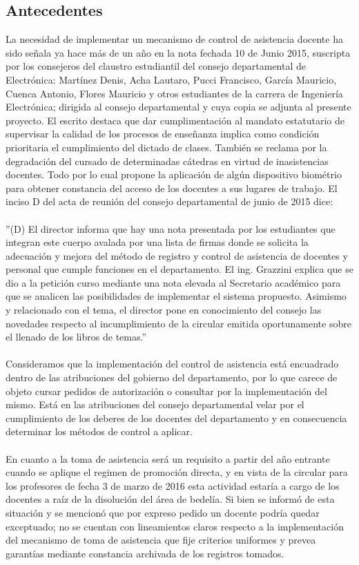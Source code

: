 \documentclass[a4paper, 11pt]{article} %
\begin{document}
\subsection*{Antecedentes}
La necesidad de implementar un mecanismo de control de asistencia docente ha sido señala ya hace más de un año en la nota fechada 10 de Junio 2015, suscripta por los consejeros del claustro estudiantil del consejo departamental de Electrónica: Martínez Denis, Acha Lautaro, Pucci Francisco, García Mauricio, Cuenca Antonio, Flores Mauricio y otros estudiantes de la carrera de Ingeniería Electrónica; dirigida al consejo departamental y cuya copia se adjunta al presente proyecto. El escrito destaca que dar cumplimentación al mandato estatutario de supervisar la calidad de los procesos de enseñanza implica como condición prioritaria el cumplimiento del dictado de clases. También se reclama por  la degradación del cursado de determinadas cátedras en virtud de inasistencias docentes. Todo por lo cual propone la aplicación de algún dispositivo biométrio para obtener constancia del acceso de los docentes a sus lugares de trabajo.
El inciso D del acta de reunión del consejo departamental de junio de 2015 dice:\\
\\
''(D) El director informa que hay una nota presentada por los estudiantes que integran este cuerpo avalada por una lista de firmas donde se solicita la adecuación y mejora del método de registro y control de asistencia de docentes y personal que cumple funciones en el departamento. El ing. Grazzini explica que se dio a la petición curso mediante una nota elevada al Secretario académico para que se analicen las posibilidades de implementar el sistema propuesto. Asimismo y relacionado con el tema, el director pone en conocimiento del consejo las novedades respecto al incumplimiento de la circular emitida oportunamente sobre el llenado de los libros de temas.''\\
\\
Consideramos que la implementación del control de asistencia está encuadrado dentro de las atribuciones del gobierno del departamento, por lo que carece de objeto cursar pedidos de autorización o consultar por la implementación del mismo. Está en las atribuciones del consejo departamental velar por el cumplimiento de los deberes de los docentes del departamento y en consecuencia determinar los métodos de control a aplicar.\\
\\
En cuanto a la toma de asistencia será un requisito a partir del año entrante cuando se aplique el regimen de promoción directa, y en vista de la circular para los profesores de fecha 3 de marzo de 2016 esta actividad estaría a cargo de los docentes a raíz de la disolución del área de bedelía. Si bien se informó de esta situación y se mencionó que por expreso pedido un docente podría quedar exceptuado; no se cuentan con lineamientos claros respecto a la implementación del mecanismo de toma de asistencia que fije criterios uniformes y prevea garantías mediante constancia archivada de los registros tomados.
\end{document}
